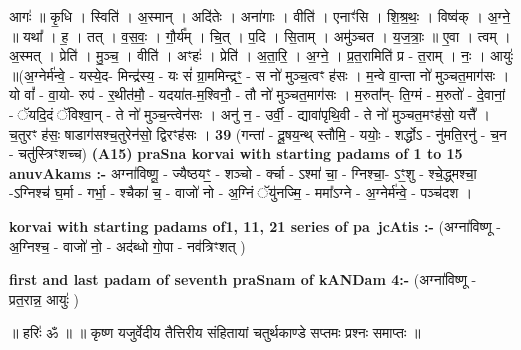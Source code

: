 \documentclass[17pt]{extarticle}
\begin{document}
                  आगः॑ ॥ कृ॒धि । स्विति॑ । अ॒स्मान् । अदि॑तेः । अना॑गाः । वीति॑ । एनाꣳ॑सि । शि॒श्र॒थः॒ । विष्व॑क् । अ॒ग्ने॒ ॥ यथा᳚ । ह॒ । तत् । व॒स॒वः॒ । गौ॒र्य᳚म् । चि॒त् । प॒दि । सि॒ताम् । अमु॑ञ्चत । य॒ज॒त्राः॒ ॥ ए॒वा । त्वम् । अ॒स्मत् । प्रेति॑ । मु॒ञ्च॒ । वीति॑ । अꣳहः॑ । प्रेति॑ । अ॒ता॒रि॒ । अ॒ग्ने॒ । प्र॒त॒रामिति॑ प्र - त॒राम् । नः॒ । आयुः॑ ॥(अ॒ग्नेर्म॑न्वे॒ - यस्ये॒द- मिन्द्र॑स्य॒ - यः सं॑ ग्रा॒ममिन्द्रꣳ॒॒ - स नो॑ मुञ्च॒त्वꣳ ह॑सः । म॒न्वे वा॒न्ता नो॑ मुञ्चत॒माग॑सः । यो वां᳚ - वा॒यो- रुप॑ - र॒थीत॑मौ॒ - यदया॑त-म॒श्विनौ॒ - तौ नो॑ मुञ्चत॒माग॑सः । म॒रुता᳚न्- ति॒ग्मं - म॒रुतो॑ - दे॒वानां॒ - ॅयदि॒दं ॅविश्वा॒न् - ते नो॑ मुञ्च॒न्त्वेन॑सः । अनु॑ न॒ - उर्वी॒ - द्यावा॑पृथि॒वी - ते नो॑ मुञ्चत॒मꣳह॑सो॒ यत्तै᳚ । च॒तुरꣳ ह॑सः॒ षाडाग॑सश्च॒तुरेन॑सो॒ द्विरꣳह॑सः । \textbf{  39 } \newline
                  \newline
                      (गन्ता॑ - दू॒षय॒न्थ् स्तौमि॒ - ययोः॒ - शर्द्धोऽ - नु॑मति॒रनु॑ - च॒न - चतु॑स्त्रिꣳशच्च)  \textbf{(A15)} \newline \newline
\textbf{praSna korvai with starting padams of 1 to 15 anuvAkams :-} \newline
अग्ना॑विष्णू॒ - ज्यैष्ठयꣳ॒॒ - शञ्चो - र्क्चा - ऽश्मा॑ चा॒ - ग्निश्चा॒- ऽꣳ॒शु - श्चे॒द्ध्मश्चा॒ -ऽग्निश्च॑ घ॒र्मा - गर्भा॒ - श्चैका॑ च॒ - वाजो॑ नो - अ॒ग्निं ॅयु॑नज्मि॒ - ममा᳚ऽग्ने - अ॒ग्नेर्म॑न्वे॒ - पञ्च॑दश । \newline

\textbf{korvai with starting padams of1, 11, 21 series of pa~jcAtis :-} \newline
(अग्ना॑विष्णू - अ॒ग्निश्च॒ - वाजो॑ नो॒ - अद॑ब्धो गो॒पा - नव॑त्रिꣳशत् ) \newline

\textbf{first and last padam of seventh praSnam of kANDam 4:-} \newline
(अग्ना॑विष्णू - प्रत॒रान्न॒ आयुः॑ ) \newline 


॥ हरिः॑ ॐ ॥
॥ कृष्ण यजुर्वेदीय तैत्तिरीय संहितायां चतुर्थकाण्डे सप्तमः प्रश्नः समाप्तः ॥
\end{document}
